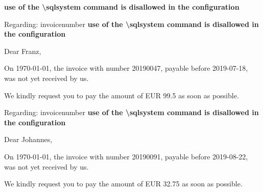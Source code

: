 \documentclass[a4paper]{article}
\begin{document}
\textbf{use of the \textbackslash sqlsystem command is disallowed in the configuration}



\begin{flushright}

Regarding: invoicenumber \textbf{use of the \textbackslash sqlsystem command is disallowed in the configuration}
\end{flushright}

\vspace{3cm}

Dear Franz,

\vspace{2cm}

On \today, the invoice with number 20190047, payable before
2019-07-18, was not yet received by us.

\vspace{5mm}

We kindly request you to pay the amount of EUR 99.5
as soon as possible.

\newpage


\begin{flushright}

Regarding: invoicenumber \textbf{use of the \textbackslash sqlsystem command is disallowed in the configuration}
\end{flushright}

\vspace{3cm}

Dear Johannes,

\vspace{2cm}

On \today, the invoice with number 20190091, payable before
2019-08-22, was not yet received by us.

\vspace{5mm}

We kindly request you to pay the amount of EUR 32.75
as soon as possible.

\newpage
\end{document}
